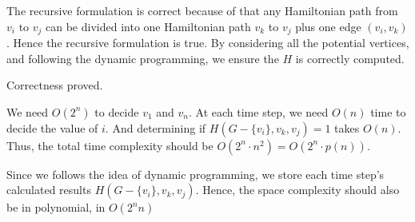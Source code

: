 The recursive formulation is correct because of that any Hamiltonian path from $v_i$ to $v_j$ can be divided into one Hamiltonian path $v_k$ to $v_j$ plus one edge $(v_i, v_k)$. Hence the recursive formulation is true. By considering all the potential vertices, and following the dynamic programming, we ensure the $H$ is correctly computed. 

Correctness proved. 


We need $O(2^n)$ to decide $v_1$ and $v_n$. At each time step, we need $O(n)$ time to decide the value of $i$. And determining if $ H(G-\{v_i\}, v_k, v_j)=1$ takes $O(n)$. Thus, the total time complexity should be $O(2^n \cdot n^2)=O(2^n \cdot p(n))$.

Since we follows the idea of dynamic programming, we store each time step's calculated results $ H(G-\{v_i\}, v_k, v_j)$. Hence, the space complexity should also be in polynomial, in $O(2^n n)$

